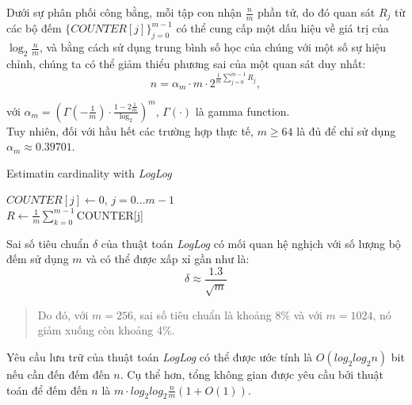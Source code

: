 \documentclass[letterpaper,13pt]{article}
\theoremstyle{mytheor}
\begin{document}
Dưới sự phân phối công bằng, mỗi tập con nhận $\frac{n}{m}$ phần tử, do đó quan sát $R_j$ từ các bộ đếm $\{COUNTER[j]\}_{j=0}^{m-1}$ có thể cung cấp 
một dấu hiệu về giá trị của $\log_2{\frac{n}{m}}$, và bằng cách sử dụng trung bình số học của chúng với một số sự hiệu chỉnh, chúng ta có thể 
giảm thiểu phương sai của một quan sát duy nhất:
\[
    n = \alpha_m \cdot m \cdot 2 ^{\frac{1}{m}\sum\limits_{j=0}^{m-1}R_j},
\]

với $\alpha_m = \left(\Gamma\left(-\frac{1}{m}\right)\cdot \frac{1-2\frac{1}{m}}{\log_2}\right)^m$, $\Gamma(\cdot)$ là gamma function.\\ 

Tuy nhiên, đối với hầu hết các trường hợp thực tế, $m \geq 64$ là đủ để chỉ sử dụng $\alpha_m \approx 0.39701$.\\

\begin{algorithm}[H]
    \vspace{0.25cm}
    \DontPrintSemicolon
    \LinesNumberedHidden
    \caption[]{Estimatin cardinality with \textit{LogLog}}
    $COUNTER[j] \gets $0, $j = 0...m - 1$\\
    $R \gets \frac{1}{m} \sum\limits_{k=0}^{m-1}$COUNTER[j] \\
    \vspace{0.25cm}
\end{algorithm}
\vspace{0.25cm}

Sai số tiêu chuẩn $\delta$ của thuật toán \textit{LogLog} có mối quan hệ nghịch với số lượng bộ đếm sử dụng $m$ và có thể được xấp xỉ gần như là:
\[\delta \approx \frac{1.3}{\sqrt{m}}\]
\vspace{0.25cm}
\begin{quote}
    Do đó, với $m = 256$, sai số tiêu chuẩn là khoảng 8\% và với $m = 1024$, nó giảm xuống còn khoảng 4\%.
    \vspace{0.25cm}
\end{quote}
\vspace{0.25cm}
\indent Yêu cầu lưu trữ của thuật toán \textit{LogLog} có thể được ước tính là $O(log_2log_2n)$ bit nếu cần đến đếm đến $n$. Cụ thể hơn, 
tổng không gian được yêu cầu bởi thuật toán để đếm đến $n$ là $m\cdot log_2log_2\frac{n}{m}(1 + O(1))$.\\
\end{document}
